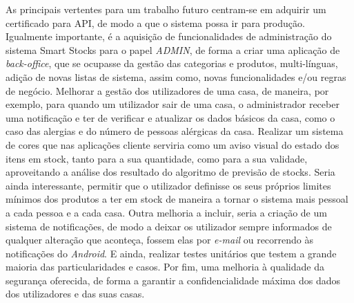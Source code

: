 As principais vertentes para um trabalho futuro centram-se em adquirir um certificado para API, de modo a que o sistema possa ir para produção. Igualmente importante, é a aquisição de funcionalidades de administração do sistema Smart Stocks para o papel \textit{ADMIN}, de forma a criar uma aplicação de \textit{back-office}, que se ocupasse da gestão das categorias e produtos, multi-línguas, adição de novas listas de sistema, assim como, novas funcionalidades e/ou regras de negócio. Melhorar a gestão dos utilizadores de uma casa, de maneira, por exemplo, para quando um utilizador sair de uma casa, o administrador receber uma notificação e ter de verificar e atualizar os dados básicos da casa, como o caso das alergias e do número de pessoas alérgicas da casa. Realizar um sistema de cores que nas aplicações cliente serviria como um aviso visual do estado dos itens em stock, tanto para a sua quantidade, como para a sua validade, aproveitando a análise dos resultado do algoritmo de previsão de stocks. Seria ainda interessante, permitir que o utilizador definisse os seus próprios limites mínimos dos produtos a ter em stock de maneira a tornar o sistema mais pessoal a cada pessoa e a cada casa. Outra melhoria a incluir, seria a criação de um sistema de notificações, de modo a deixar os utilizador sempre informados de qualquer alteração que aconteça, fossem elas por \textit{e-mail} ou recorrendo às notificações do \textit{Android}. E ainda, realizar testes unitários que testem a grande maioria das particularidades e casos. Por fim, uma melhoria à qualidade da segurança oferecida, de forma a garantir a confidencialidade máxima dos dados dos utilizadores e das suas casas.
